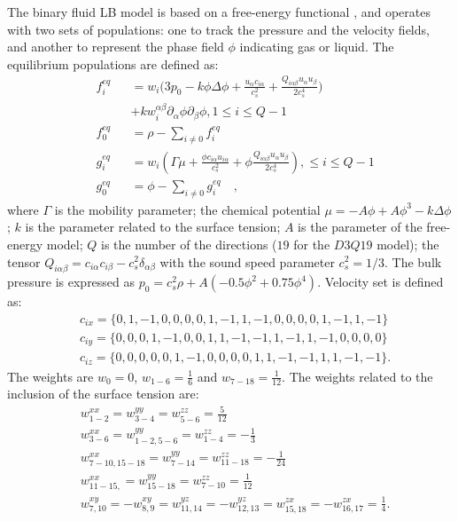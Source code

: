 \documentclass{article}
\begin{document}
The binary fluid LB model is
based on a free-energy functional \cite{swift,landau}, and operates with two
sets of populations: one to track the pressure and the velocity fields, and another to represent the
phase field $\phi$ indicating gas or liquid.
The equilibrium populations \cite{pooley-contact} are defined as:
\begin{equation}
\label{set:equilibrium:binary}
\begin{aligned}
&f_i^{eq}&&=w_i 
\biggl(3
p_0 - k \phi \Delta \phi
+\frac{u_{\alpha}c_{i\alpha}}{c_s^2}+\frac{Q_{i\alpha\beta}u_{\alpha } u_ {
\beta}}{2 c_s^4}\biggr)\\
&&&+k w_i^{\alpha\beta} \partial_{\alpha} \phi\partial_{\beta} \phi, 1\leq i \leq Q-1\\
&f_0^{eq}&&=\rho-\sum_{i\neq0}{f_i^{eq}}\\
&g_i^{eq}&&=w_i\left(\Gamma \mu + \frac{\phi c_{i\alpha} u_{i\alpha}}{c_s^2}+\phi
\frac{Q_{i\alpha\beta}u_{\alpha}u_{\beta}}{2 c_s^4}\right), \leq i \leq Q-1\\
&g_0^{eq}&&=\phi-\sum_{i\neq0}{g_i^{eq}}\quad,
\end{aligned}
\end{equation}
where $\Gamma$ is the mobility parameter; the chemical potential
$\mu=-A\phi+A\phi^3-k\Delta\phi$; $k$ is the parameter related to the surface
tension; $A$ is the parameter of the free-energy model; $Q$ is the number of the directions ($19$
for the $D3Q19$ model); the tensor
$Q_{i\alpha\beta}=c_{i\alpha} c_{i\beta} - c_s^2 \delta_{\alpha\beta}$ with
the sound speed parameter $c_s^2=1/3$. The bulk pressure
is expressed as $p_0=c_s^2 \rho +A (-0.5 \phi^2+0.75 \phi^4)$. Velocity set is defined as:
\begin{equation} 
\begin{aligned}
&c_{ix}=\{0,1,-1,0, 0,0, 0,1,-1, 1,-1,0, 0, 0, 0,1,-1, 1,-1\}\\
&c_{iy}=\{0,0, 0,1,-1,0, 0,1, 1,-1,-1,1,-1, 1,-1,0, 0, 0, 0\}\\
&c_{iz}=\{0,0, 0,0, 0,1,-1,0, 0, 0, 0,1, 1,-1,-1,1, 1,-1,-1\}.
\end{aligned}
\end{equation}
The weights are $w_0=0$, $w_{1-6}=\frac{1}{6}$ and $w_{7-18}=\frac{1}{12}$. The weights
related to the inclusion of the surface tension are:
\begin{equation}
\begin{aligned}
&w^{xx}_{1-2}=w^{yy}_{3-4}=w^{zz}_{5-6}=\frac{5}{12}\\
&w^{xx}_{3-6}=w^{yy}_{1-2,5-6}=w^{zz}_{1-4}=-\frac{1}{3}\\
&w^{xx}_{7-10,15-18}=w^{yy}_{7-14}=w^{zz}_{11-18}=-\frac{1}{24}\\
&w^{xx}_{11-15,}=w^{yy}_{15-18}=w^{zz}_{7-10}=\frac{1}{12}\\
&w^{xy}_{7,10}=-w^{xy}_{8,9}=w^{yz}_{11,14}=-w^{yz}_{12,13}=w^{zx}_{15,18}=-w^{zx}_{16,17}=\frac{1}{
4}.
\end{aligned}
\end{equation}
\end{document}
